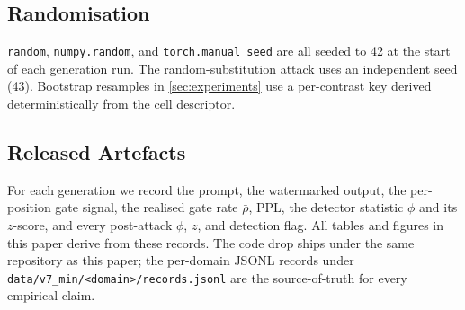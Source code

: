 \subsection{Randomisation}

\texttt{random}, \texttt{numpy.random}, and
\texttt{torch.manual\_seed} are all seeded to 42 at the start of
each generation run. The random-substitution attack uses an
independent seed (43). Bootstrap resamples in
\autoref{sec:experiments} use a per-contrast key derived
deterministically from the cell descriptor.

\subsection{Released Artefacts}
\label{app:repro:paths}

For each generation we record the prompt, the watermarked output,
the per-position gate signal, the realised gate rate $\bar\rho$,
PPL, the detector statistic $\phi$ and its $z$-score, and every
post-attack $\phi$, $z$, and detection flag. All tables and figures
in this paper derive from these records. The code drop ships under
the same repository as this paper; the per-domain JSONL records
under \texttt{data/v7\_min/<domain>/records.jsonl} are the
source-of-truth for every empirical claim.

